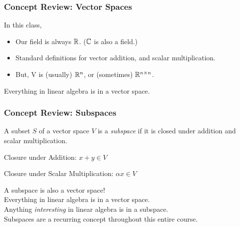 \documentclass{beamer}
\renewenvironment{enumerate}%
{\begin{list}{\arabic{enumi}.}%
      {\setlength{\leftmargin}{2.5em}%
       \setlength{\itemsep}{-\parsep}%
       \setlength{\topsep}{-\parskip}%
       \usecounter{enumi}}%
 }{\end{list}}
\begin{document}
\begin{frame}
\frametitle{Concept Review: Vector Spaces}
In this class,
\begin{itemize}
\item Our field is always $\mathbb{R}$. ($\mathbb{C}$ is also a field.)
\item Standard definitions for vector addition, and scalar multiplication.
\item But, V is (usually) $\mathbb{R}^n$, or (sometimes) $\mathbb{R}^{n\times n}$.
\end{itemize}

Everything in linear algebra is in a vector space.
\end{frame}

\begin{frame}
\frametitle{Concept Review: Subspaces}
\begin{definition}[Subspace]
	A subset $S$ of a vector space $V$ is a \emph{subspace} if it is closed under addition and scalar multiplication.
	\begin{enumerate}
		\item[1.] Closure under Addition: $x+y \in V$
		\item[2.] Closure under Scalar Multiplication: $\alpha x \in V$
	\end{enumerate}
\end{definition}
A subspace is also a vector space!\\
Everything in linear algebra is in a vector space. \\ 
Anything \textit{interesting} in linear algebra is in a subspace. \\
Subspaces are a recurring concept throughout this entire course.
\end{frame}
\end{document}
